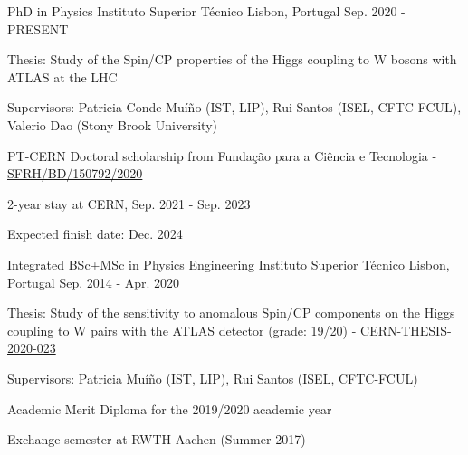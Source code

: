 
\begin{cventries}

\cventry
  {PhD in Physics}
  {Instituto Superior Técnico}
  {Lisbon, Portugal}
  {Sep. 2020 - PRESENT}
  {
    \begin{cvitems}
      \item {Thesis: Study of the Spin/CP properties of the Higgs coupling to W bosons with ATLAS at the LHC}
      \item {Supervisors: Patricia Conde Muíño (IST, LIP), Rui Santos (ISEL, CFTC-FCUL), Valerio Dao (Stony Brook University)}
      \item {PT-CERN Doctoral scholarship from Fundação para a Ciência e Tecnologia - \href{https://doi.org/10.54499/SFRH/BD/150792/2020}{SFRH/BD/150792/2020}}
      \item {2-year stay at CERN, Sep. 2021 - Sep. 2023}
      \item {Expected finish date: Dec. 2024}
    \end{cvitems}
  }

  \cventry
    {Integrated BSc+MSc in Physics Engineering} %
    {Instituto Superior Técnico} %
    {Lisbon, Portugal} %
    {Sep. 2014 - Apr. 2020} %
    {
      \begin{cvitems} %
        \item {Thesis: Study of the sensitivity to anomalous Spin/CP components on the Higgs coupling to W pairs with the ATLAS detector (grade: 19/20) - \href{https://cds.cern.ch/record/2715646}{CERN-THESIS-2020-023}}
        \item {Supervisors: Patricia Muíño (IST, LIP), Rui Santos (ISEL, CFTC-FCUL)}
        \item {Academic Merit Diploma for the 2019/2020 academic year}
        \item {Exchange semester at RWTH Aachen (Summer 2017)}
      \end{cvitems}
    }



\end{cventries}